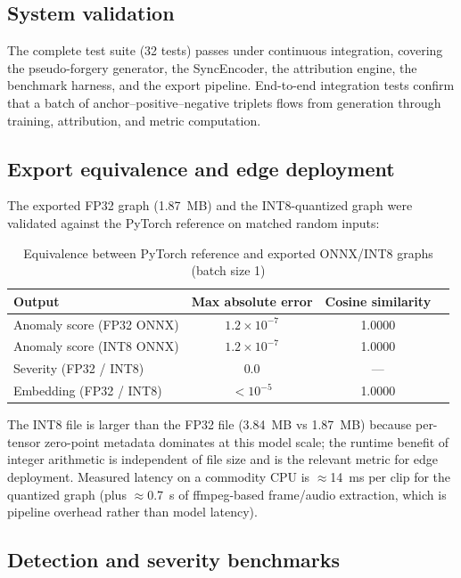 \documentclass[sn-basic,Numbered,referee]{sn-jnl}
\begin{document}
\subsection{System validation}

The complete test suite (32 tests) passes under continuous integration, covering the pseudo-forgery generator, the SyncEncoder, the attribution engine, the benchmark harness, and the export pipeline. End-to-end integration tests confirm that a batch of anchor--positive--negative triplets flows from generation through training, attribution, and metric computation.

\subsection{Export equivalence and edge deployment}

The exported FP32 graph (1.87~MB) and the INT8-quantized graph were validated against the PyTorch reference on matched random inputs:

\begin{table}[h]
\centering
\caption{Equivalence between PyTorch reference and exported ONNX/INT8 graphs (batch size 1)}
\begin{tabular}{lccc}
\toprule
Output & Max absolute error & Cosine similarity \\
\midrule
Anomaly score (FP32 ONNX) & $1.2 \times 10^{-7}$ & 1.0000 \\
Anomaly score (INT8 ONNX) & $1.2 \times 10^{-7}$ & 1.0000 \\
Severity (FP32 / INT8) & $0.0$ & --- \\
Embedding (FP32 / INT8) & $< 10^{-5}$ & 1.0000 \\
\bottomrule
\end{tabular}
\label{tab:equivalence}
\end{table}

The INT8 file is larger than the FP32 file (3.84~MB vs 1.87~MB) because per-tensor zero-point metadata dominates at this model scale; the runtime benefit of integer arithmetic is independent of file size and is the relevant metric for edge deployment. Measured latency on a commodity CPU is $\approx$14~ms per clip for the quantized graph (plus $\approx$0.7~s of ffmpeg-based frame/audio extraction, which is pipeline overhead rather than model latency).

\subsection{Detection and severity benchmarks}
\end{document}
